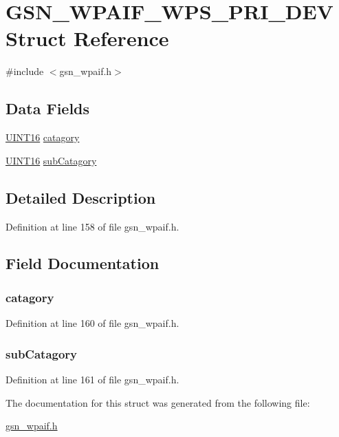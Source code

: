 \hypertarget{a00428}{
\section{GSN\_\-WPAIF\_\-WPS\_\-PRI\_\-DEV Struct Reference}
\label{a00428}
}


{\ttfamily \#include $<$gsn\_\-wpaif.h$>$}

\subsection*{Data Fields}
\begin{DoxyCompactItemize}
\item 
\hyperlink{a00660_ga09f1a1fb2293e33483cc8d44aefb1eb1}{UINT16} \hyperlink{a00428_a60e1aee9c697e301ccb6ab1746dd50fa}{catagory}
\item 
\hyperlink{a00660_ga09f1a1fb2293e33483cc8d44aefb1eb1}{UINT16} \hyperlink{a00428_a3b9b0d977040a39b1525f4ab074ae263}{subCatagory}
\end{DoxyCompactItemize}


\subsection{Detailed Description}


Definition at line 158 of file gsn\_\-wpaif.h.



\subsection{Field Documentation}
\hypertarget{a00428_a60e1aee9c697e301ccb6ab1746dd50fa}{
\subsubsection[{catagory}]{ {\bf catagory}}}
\label{a00428_a60e1aee9c697e301ccb6ab1746dd50fa}


Definition at line 160 of file gsn\_\-wpaif.h.

\hypertarget{a00428_a3b9b0d977040a39b1525f4ab074ae263}{
\subsubsection[{subCatagory}]{ {\bf subCatagory}}}
\label{a00428_a3b9b0d977040a39b1525f4ab074ae263}


Definition at line 161 of file gsn\_\-wpaif.h.



The documentation for this struct was generated from the following file:\begin{DoxyCompactItemize}
\item 
\hyperlink{a00615}{gsn\_\-wpaif.h}\end{DoxyCompactItemize}
